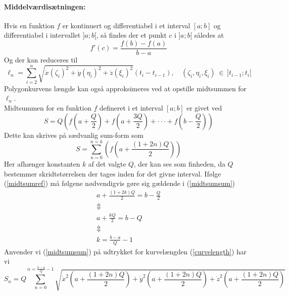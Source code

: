 \paragraph{Middelværdisætningen:} 
Hvis en funktion \(f\) er kontinuert og differentiabel i et interval \([a;b]\) og differentiabel i intervallet \(]a;b[\), så findes der et punkt \(c\) i \(]a;b[\) således at
\begin{equation}
f\prime(c) = \frac{f(b)-f(a)}{b-a}
\end{equation}
Og der kan reduceres til
\begin{equation}
 \ell _n = \sum\limits_{i=2}^n \sqrt{ \dot{x}(\zeta_i)^2 +\dot{y}(\eta_i)^2 + \dot{z}(\xi_i)^2}(t_i-t_{i-1}), \quad (\zeta_i, \eta_i, \xi_i) ~ \in ~ ]t_{i-1};t_i[
 \label{ellndiff}
\end{equation}
Polygonkurvens længde kan også approksimeres ved at opstille midtsummen for \(\ell_n\).\\
Midtsummen for en funktion \(f\) defineret i et interval \([a;b]\) er givet ved
\begin{equation}
S=Q\left(f\left(a+\frac{Q}{2}\right) + f\left(a+\frac{3Q}{2}\right) + \cdot\cdot\cdot + f\left(b-\frac{Q}{2}\right)\right)
\label{midtsumref}
\end{equation}
Dette kan skrives på sædvanlig sum-form som
\begin{equation}
S=\sum\limits_{n=0}^{n=k} \left(f\left(a+\frac{(1+2n)Q}{2}\right)\right)
\label{midtsumsum}
\end{equation}
Her afhænger konstanten \(k\) af det valgte \(Q\), der kan ses som finheden, da \(Q\) bestemmer skridtstørrelsen der tages inden for det givne interval. Ifølge (\ref{midtsumref}) må følgene nødvendigvis gøre sig gældende i (\ref{midtsumsum})
\begin{equation}
\begin{gathered}
a+\frac{(1+2k)Q}{2} =b-\frac{Q}{2} \\
\Updownarrow \\
a+\frac{kQ}{2} = b-Q \\
\Updownarrow \\
k = \frac{b-a}{Q}-1
\end{gathered}
\end{equation}
Anvender vi (\ref{midtsumsum}) på udtrykket for kurvelængden (\ref{curvelength}) har vi
\begin{equation}
S_n = Q\sum\limits_{n=0}^{n=\frac{b-a}{Q}-1}\sqrt{\dot{x}^2\left(a+\frac{(1+2n)Q}{2}\right)+\dot{y}^2\left(a+\frac{(1+2n)Q}{2}\right)+\dot{z}^2\left(a+\frac{(1+2n)Q}{2}\right)}
\end{equation}
